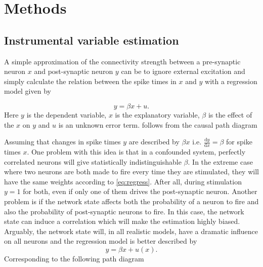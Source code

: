 \documentclass[11pt]{article}
\newcommand{\de}[2]{\frac{\mathrm{d} #1}{\mathrm{d} #2}}
\begin{document}
\section{Methods}
\subsection{Instrumental variable estimation}
A simple approximation of the connectivity strength between a pre-synaptic neuron $ x $ and post-synaptic neuron $ y $ can be to ignore external excitation and simply calculate the relation between the spike times in $ x $ and $ y $ with a regression model given by

\begin{equation}
y = \beta x + u.
\label{eq:regress}
\end{equation}
Here $ y $ is the dependent variable, $ x $ is the explanatory variable, $ \beta $ is the effect of the $ x$ on $y $ and $ u $ is an unknown error term.  follows from the causal path diagram \citep{wright1921correlation,wright1923theory}
\begin{center}
\end{center}
Assuming that changes in spike times $ y $ are described by $ \beta x $ i.e. $ \de{y}{x} = \beta $ for spike times $ x $. One problem with this idea is that in a confounded system, perfectly correlated neurons will give statistically indistinguishable $ \beta $. In the extreme case where two neurons are both made to fire every time they are stimulated, they will have the same weights according to \cref{eq:regress}. After all, during stimulation $ y=1 $ for both, even if only one of them drives the post-synaptic neuron. Another problem is if the network state affects both the probability of a neuron to fire and also the probability of post-synaptic neurons to fire. In this case, the network state can induce a correlation which will make the estimation highly biased. Arguably, the network state will, in all realistic models, have a dramatic influence on all neurons and the regression model is better described by
\begin{equation}
y = \beta x + u(x).
\end{equation}
Corresponding to the following path diagram
\end{document}
